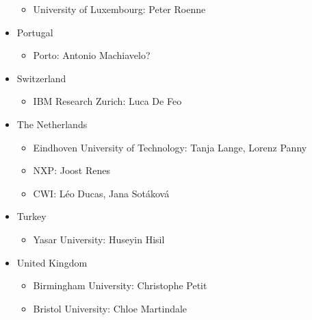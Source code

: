 \documentclass{article}
\begin{document}
\begin{itemize}
		\begin{itemize}
			\item {\red University of Luxembourg: Peter Roenne}
		\end{itemize}
	\item Portugal
		\begin{itemize}
			\item {\red Porto: Antonio Machiavelo?}
		\end{itemize}
	\item Switzerland
		\begin{itemize}
			\item IBM Research Zurich: Luca De Feo
		\end{itemize}
	\item The Netherlands
		\begin{itemize}
			\item Eindhoven University of Technology: Tanja Lange, Lorenz Panny
			\item {\red NXP: Joost Renes}
			\item {\red CWI: L\'{e}o Ducas, Jana Sot\'{a}kov\'{a}}
		\end{itemize}
	\item Turkey
		\begin{itemize}
			\item Yasar University: Huseyin Hisil
		\end{itemize}
	\item United Kingdom
		\begin{itemize}
			\item Birmingham University: Christophe Petit
			\item Bristol University: Chloe Martindale
		\end{itemize}
\end{itemize}



\end{document}
